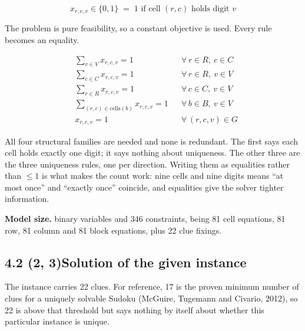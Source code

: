\documentclass[11pt]{article}
\begin{document}
\[
  x_{r,c,v} \in \{0,1\} \;=\; 1 \text{ if cell } (r,c) \text{ holds digit } v
\]

The problem is pure feasibility, so a constant objective is used. Every
rule becomes an equality.

\begin{align}
  & \sum_{v \in V} x_{r,c,v} = 1 && \forall\, r \in R,\ c \in C \\[2pt]
  & \sum_{c \in C} x_{r,c,v} = 1 && \forall\, r \in R,\ v \in V \\[2pt]
  & \sum_{r \in R} x_{r,c,v} = 1 && \forall\, c \in C,\ v \in V \\[2pt]
  & \sum_{(r,c) \in \mathrm{cells}(b)} x_{r,c,v} = 1 && \forall\, b \in B,\ v \in V \\[2pt]
  & x_{r,c,v} = 1 && \forall\, (r,c,v) \in G
\end{align}

All four structural families are needed and none is redundant. The first
says each cell holds exactly one digit; it says nothing about
uniqueness. The other three are the three uniqueness rules, one per
direction. Writing them as equalities rather than $\le 1$ is what makes
the count work: nine cells and nine digits means ``at most once'' and
``exactly once'' coincide, and equalities give the solver tighter
information.

\textbf{Model size.} binary variables and 346 constraints,
being 81 cell equations, 81 row, 81 column and 81 block equations, plus
22 clue fixings.

\subsection*{4.2 (2, 3)\quad Solution of the given instance}

The instance carries 22 clues. For reference, 17 is the proven minimum
number of clues for a uniquely solvable Sudoku (McGuire, Tugemann and
Civario, 2012), so 22 is above that threshold but says nothing by itself
about whether this particular instance is unique.
\end{document}

